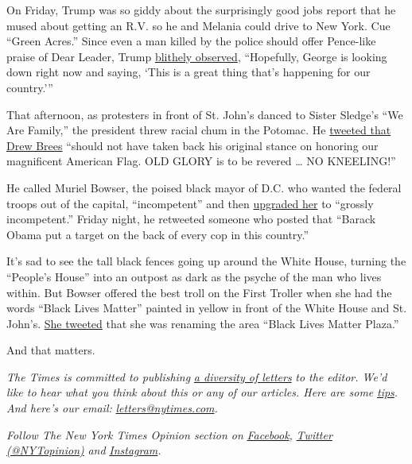 On Friday, Trump was so giddy about the surprisingly good jobs report
that he mused about getting an R.V. so he and Melania could drive to New
York. Cue ``Green Acres.'' Since even a man killed by the police should
offer Pence-like praise of Dear Leader, Trump
\href{https://www.nytimes.com/2020/06/05/us/politics/trump-jobs-report-george-floyd.html}{blithely
observed}, ``Hopefully, George is looking down right now and saying,
`This is a great thing that's happening for our country.'''

That afternoon, as protesters in front of St. John's danced to Sister
Sledge's ``We Are Family,'' the president threw racial chum in the
Potomac. He
\href{https://twitter.com/realDonaldTrump/status/1268998142860627969}{tweeted
that Drew Brees} ``should not have taken back his original stance on
honoring our magnificent American Flag. OLD GLORY is to be revered
\ldots{} NO KNEELING!''

He called Muriel Bowser, the poised black mayor of D.C. who wanted the
federal troops out of the capital, ``incompetent'' and then
\href{https://twitter.com/realdonaldtrump/status/1269043981461184514}{upgraded
her} to ``grossly incompetent.'' Friday night, he retweeted someone who
posted that ``Barack Obama put a target on the back of every cop in this
country.''

It's sad to see the tall black fences going up around the White House,
turning the ``People's House'' into an outpost as dark as the psyche of
the man who lives within. But Bowser offered the best troll on the First
Troller when she had the words ``Black Lives Matter'' painted in yellow
in front of the White House and St. John's.
\href{https://twitter.com/MayorBowser/status/1268928589975695361?s=20}{She
tweeted} that she was renaming the area ``Black Lives Matter Plaza.''

And that matters.

\emph{The Times is committed to publishing}
\href{https://www.nytimes.com/2019/01/31/opinion/letters/letters-to-editor-new-york-times-women.html}{\emph{a
diversity of letters}} \emph{to the editor. We'd like to hear what you
think about this or any of our articles. Here are some}
\href{https://help.nytimes.com/hc/en-us/articles/115014925288-How-to-submit-a-letter-to-the-editor}{\emph{tips}}\emph{.
And here's our email:}
\href{mailto:letters@nytimes.com}{\emph{letters@nytimes.com}}\emph{.}

\emph{Follow The New York Times Opinion section on}
\href{https://www.facebook.com/nytopinion}{\emph{Facebook}}\emph{,}
\href{http://twitter.com/NYTOpinion}{\emph{Twitter (@NYTopinion)}}
\emph{and}
\href{https://www.instagram.com/nytopinion/}{\emph{Instagram}}\emph{.}


